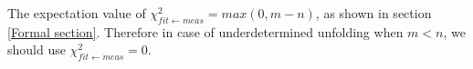 \documentclass[a4paper, 12pt]{article}
\newcommand{\ve}[1]{\boldsymbol{#1}}
\newcommand{\chifit}{\frac{\chi^2_{fit\leftarrow meas}}{DoF} }
\begin{document}
The expectation value of $\chi^2_{fit\leftarrow meas}=max(0, m-n)$, as shown in section \ref{Formal section}. Therefore in case of underdetermined unfolding when $m<n$, we should use $\chi^2_{fit\leftarrow meas}=0$.

\end{document}
